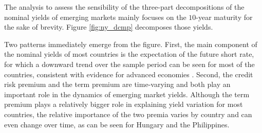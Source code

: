 {%

The analysis to assess the sensibility of the three-part decompositions of the nominal yields of emerging markets mainly focuses on the \(10\)-year maturity for the sake of brevity.
%	
Figure \ref{fig:ny_dcmp} decomposes those yields.

Two patterns immediately emerge from the figure. 
First, the main component of the nominal yields of most countries is the expectation of the future short rate, for which a downward trend over the sample period can be seen for most of the countries, consistent with evidence for advanced economies \citep{ACDM:2019}.
Second, the credit risk premium and the term premium are time-varying and both play an important role in the dynamics of emerging market yields.
Although the term premium plays a relatively bigger role 
in explaining yield variation for most countries,
the relative importance of the two premia varies by country and can even change over time, as can be seen for Hungary and the Philippines.


}
